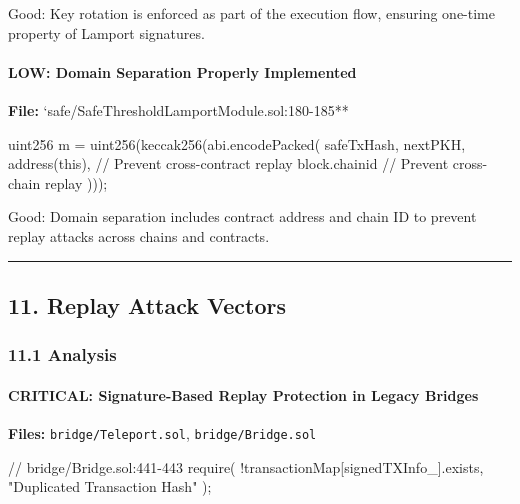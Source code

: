 \documentclass[
]{article}
\newenvironment{Shaded}{}{}
\newcommand{\NormalTok}[1]{#1}
\begin{document}
Good: Key rotation is enforced as part of the execution flow, ensuring
one-time property of Lamport signatures.

\paragraph{LOW: Domain Separation Properly
Implemented}\label{low-domain-separation-properly-implemented}

\textbf{File:} `safe/SafeThresholdLamportModule.sol:180-185**

\begin{Shaded}
\begin{Highlighting}[]
\NormalTok{uint256 m = uint256(keccak256(abi.encodePacked(}
\NormalTok{    safeTxHash,}
\NormalTok{    nextPKH,}
\NormalTok{    address(this),   // Prevent cross{-}contract replay}
\NormalTok{    block.chainid    // Prevent cross{-}chain replay}
\NormalTok{)));}
\end{Highlighting}
\end{Shaded}

Good: Domain separation includes contract address and chain ID to
prevent replay attacks across chains and contracts.

\begin{center}\rule{0.5\linewidth}{0.5pt}\end{center}

\subsection{11. Replay Attack Vectors}\label{11-replay-attack-vectors}

\subsubsection{11.1 Analysis}\label{111-analysis}

\paragraph{CRITICAL: Signature-Based Replay Protection in Legacy
Bridges}\label{critical-signature-based-replay-protection-in-legacy-bridges}

\textbf{Files:} \texttt{bridge/Teleport.sol}, \texttt{bridge/Bridge.sol}

\begin{Shaded}
\begin{Highlighting}[]
\NormalTok{// bridge/Bridge.sol:441{-}443}
\NormalTok{require(}
\NormalTok{    !transactionMap[signedTXInfo\_].exists,}
\NormalTok{    "Duplicated Transaction Hash"}
\NormalTok{);}
\end{Highlighting}
\end{Shaded}
\end{document}
